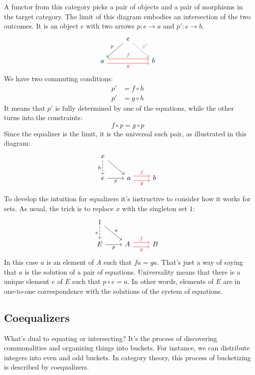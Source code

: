 \documentclass[DaoFP]{subfiles}
\begin{document}
A functor from this category picks a pair of objects and a pair of morphisms in the target category. The limit of this diagram embodies an intersection of the two outcomes. It is an object $e$ with two arrows $p \colon e \to a$ and $p' \colon e \to b$.
\[
\begin{tikzcd}
& e
\arrow[dl, "p"']
\arrow[dr, gray, "p'"]
\\
a 
\arrow[rr, red, shift left=.75ex, "f"]
\arrow[rr, red, shift right=.75ex, "g"']
&&
b
\end{tikzcd}
\]
We have two commuting conditions:
\begin{align*}
p' &= f \circ h \\
p' &= g \circ h
\end{align*}
It means that $p'$ is fully determined by one of the equations, while the other turns into the constraints:
\[ f \circ p = g \circ p \]
Since the equalizer is the limit, it is the universal such pair, as illustrated in this diagram:
\[
\begin{tikzcd}
x
\arrow[d, dashed, "h"']
\arrow[dr, ""]
\\
e
\arrow[r, "p"']
&
a \arrow[r, red, shift left=0.75ex, "f"]
  \arrow[r, red, shift right=0.75ex, "g"']
&
b
\end{tikzcd}
\]

To develop the intuition for equalizers it's instructive to consider how it works for sets. As usual, the trick is to replace $x$ with the singleton set $1$:
\[
\begin{tikzcd}
1
\arrow[d, dashed, "e"']
\arrow[dr, "a"]
\\
E
\arrow[r, "p"']
&
A \arrow[r, red, shift left=0.75ex, "f"]
  \arrow[r, red, shift right=0.75ex, "g"']
&
B
\end{tikzcd}
\]
In this case $a$ is an element of $A$ such that $f a = g a$. That's just a way of saying that $a$ is the solution of a pair of equations. Universality means that there is a unique element $e$ of $E$ such that $p \circ e = a$. In other words, elements of $E$ are in one-to-one correspondence with the solutions of the system of equations. 

\subsection{Coequalizers}

What's dual to equating or intersecting? It's the process of discovering commonalities and organizing things into buckets. For instance, we can distribute integers into even and odd buckets. In category theory, this process of bucketizing is described by coequalizers.
\end{document}
